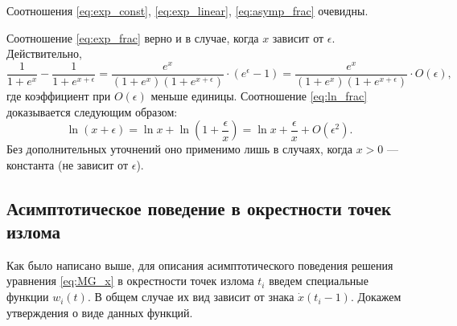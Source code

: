 Соотношения \eqref{eq:exp_const}, \eqref{eq:exp_linear}, \eqref{eq:asymp_frac} очевидны.

Соотношение \eqref{eq:exp_frac} верно и в случае, когда $x$ зависит от $\epsilon$. Действительно,
%
\[
\dfrac{1}{1 + e^x} - \dfrac{1}{1 + e^{x + \epsilon}} = \dfrac{e^x}{(1 + e^x)(1 + e^{x + \epsilon})} \cdot (e^{\epsilon} - 1) = \dfrac{e^x}{(1 + e^x)(1 + e^{x + \epsilon})} \cdot O(\epsilon),
\]
где коэффициент при $O(\epsilon)$ меньше единицы.
%
Соотношение \eqref{eq:ln_frac} доказывается следующим образом:
\[
\ln(x + \epsilon) = \ln x + \ln(1 + \frac{\epsilon}{x}) = \ln x + \frac{\epsilon}{x} + O(\epsilon^2).
\]
Без дополнительных уточнений оно применимо лишь в случаях, когда $x > 0$ --- константа (не зависит от $\epsilon$).

\subsection{Асимптотическое поведение в окрестности точек излома}

Как было написано выше, для описания асимптотического поведения решения уравнения \eqref{eq:MG_x} в окрестности точек излома $t_i$ введем специальные функции $w_i(t)$. В общем случае их вид зависит от знака $\dot{x}(t_i - 1)$. Докажем утверждения о виде данных функций.

